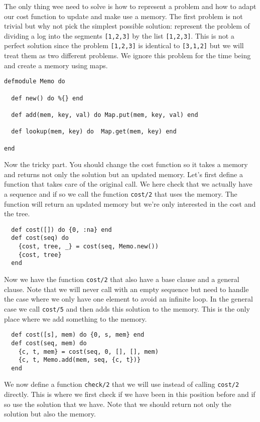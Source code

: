 \documentclass[a4paper,11pt]{article}
\begin{document}
The only thing wee need to solve is how to represent a problem and how
to adapt our cost function to update and make use a memory. The first
problem is not trivial but why not pick the simplest possible
solution: represent the problem of dividing a log into the segments
{\tt [1,2,3]} by the list {\tt [1,2,3]}. This is not a perfect
solution since the problem {\tt [1,2,3]} is identical to {\tt [3,1,2]}
but we will treat them as two different problems. We ignore this
problem for the time being and create a memory using maps.

\begin{verbatim}
defmodule Memo do

  def new() do %{} end

  def add(mem, key, val) do Map.put(mem, key, val) end

  def lookup(mem, key) do  Map.get(mem, key) end

end
\end{verbatim}

Now the tricky part. You should change the cost function so it takes a
memory and returns not only the solution but an updated memory. Let's
first define a function that takes care of the original call. We here
check that we actually have a sequence and if so we call the function
{\tt cost/2} that uses the memory. The function will return an updated
memory but we're only interested in the cost and the tree.

\begin{verbatim}
  def cost([]) do {0, :na} end
  def cost(seq) do
    {cost, tree, _} = cost(seq, Memo.new())
    {cost, tree}
  end
\end{verbatim}


Now we have the function {\tt cost/2} that also have a base clause and
a general clause. Note that we will never call with an empty sequence
but need to handle the case where we only have one element to avoid an
infinite loop. In the general case we call {\tt cost/5} and then adds
this solution to the memory. This is the only place where we add
something to the memory.

\begin{verbatim}
  def cost([s], mem) do {0, s, mem} end
  def cost(seq, mem) do
    {c, t, mem} = cost(seq, 0, [], [], mem)
    {c, t, Memo.add(mem, seq, {c, t})}
  end  
\end{verbatim}


We now define a function {\tt check/2} that we will use instead of
calling {\tt cost/2} directly. This is where we first check if we have
been in this position before and if so use the solution that we
have. Note that we should return not only the solution but also the
memory.
\end{document}
